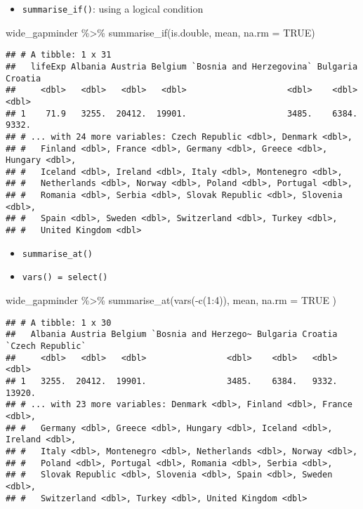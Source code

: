 \documentclass[
]{book}
\newenvironment{Shaded}{\begin{snugshade}}{\end{snugshade}}
\newcommand{\AttributeTok}[1]{\textcolor[rgb]{0.77,0.63,0.00}{#1}}
\newcommand{\ConstantTok}[1]{\textcolor[rgb]{0.00,0.00,0.00}{#1}}
\newcommand{\DecValTok}[1]{\textcolor[rgb]{0.00,0.00,0.81}{#1}}
\newcommand{\FunctionTok}[1]{\textcolor[rgb]{0.00,0.00,0.00}{#1}}
\newcommand{\NormalTok}[1]{#1}
\newcommand{\SpecialCharTok}[1]{\textcolor[rgb]{0.00,0.00,0.00}{#1}}
\providecommand{\tightlist}{%
  \setlength{\itemsep}{0pt}\setlength{\parskip}{0pt}}
\begin{document}
\begin{itemize}
\tightlist
\item
  \texttt{summarise\_if()}: using a logical condition
\end{itemize}

\begin{Shaded}
\begin{Highlighting}[]
\NormalTok{wide\_gapminder }\SpecialCharTok{\%\textgreater{}\%}
  \FunctionTok{summarise\_if}\NormalTok{(is.double, mean, }\AttributeTok{na.rm =} \ConstantTok{TRUE}\NormalTok{)}
\end{Highlighting}
\end{Shaded}

\begin{verbatim}
## # A tibble: 1 x 31
##   lifeExp Albania Austria Belgium `Bosnia and Herzegovina` Bulgaria Croatia
##     <dbl>   <dbl>   <dbl>   <dbl>                    <dbl>    <dbl>   <dbl>
## 1    71.9   3255.  20412.  19901.                    3485.    6384.   9332.
## # ... with 24 more variables: Czech Republic <dbl>, Denmark <dbl>,
## #   Finland <dbl>, France <dbl>, Germany <dbl>, Greece <dbl>, Hungary <dbl>,
## #   Iceland <dbl>, Ireland <dbl>, Italy <dbl>, Montenegro <dbl>,
## #   Netherlands <dbl>, Norway <dbl>, Poland <dbl>, Portugal <dbl>,
## #   Romania <dbl>, Serbia <dbl>, Slovak Republic <dbl>, Slovenia <dbl>,
## #   Spain <dbl>, Sweden <dbl>, Switzerland <dbl>, Turkey <dbl>,
## #   United Kingdom <dbl>
\end{verbatim}

\begin{itemize}
\item
  \texttt{summarise\_at()}
\item
  \texttt{vars()\ =\ select()}
\end{itemize}

\begin{Shaded}
\begin{Highlighting}[]
\NormalTok{wide\_gapminder }\SpecialCharTok{\%\textgreater{}\%}
  \FunctionTok{summarise\_at}\NormalTok{(}\FunctionTok{vars}\NormalTok{(}\SpecialCharTok{{-}}\FunctionTok{c}\NormalTok{(}\DecValTok{1}\SpecialCharTok{:}\DecValTok{4}\NormalTok{)),}
\NormalTok{    mean,}
    \AttributeTok{na.rm =} \ConstantTok{TRUE}
\NormalTok{  )}
\end{Highlighting}
\end{Shaded}

\begin{verbatim}
## # A tibble: 1 x 30
##   Albania Austria Belgium `Bosnia and Herzego~ Bulgaria Croatia `Czech Republic`
##     <dbl>   <dbl>   <dbl>                <dbl>    <dbl>   <dbl>            <dbl>
## 1   3255.  20412.  19901.                3485.    6384.   9332.           13920.
## # ... with 23 more variables: Denmark <dbl>, Finland <dbl>, France <dbl>,
## #   Germany <dbl>, Greece <dbl>, Hungary <dbl>, Iceland <dbl>, Ireland <dbl>,
## #   Italy <dbl>, Montenegro <dbl>, Netherlands <dbl>, Norway <dbl>,
## #   Poland <dbl>, Portugal <dbl>, Romania <dbl>, Serbia <dbl>,
## #   Slovak Republic <dbl>, Slovenia <dbl>, Spain <dbl>, Sweden <dbl>,
## #   Switzerland <dbl>, Turkey <dbl>, United Kingdom <dbl>
\end{verbatim}
\end{document}
